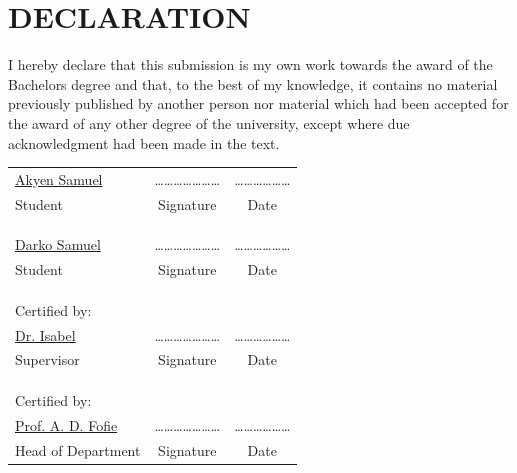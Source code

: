 \chapter*{DECLARATION}

I hereby declare that this submission is my own work towards the award of the Bachelors degree and that,
to the best of my knowledge, it contains no material previously published by another person nor material
which had been accepted for the award of any other degree of the university, except where due 
acknowledgment had been made in the text.\\

\begin{center}
 \begin{tabular}{lcc}
 \underline{Akyen Samuel} &\quad\quad\quad \ldots\ldots\ldots\ldots\ldots\ldots\ldots &\quad\quad\quad \ldots\ldots\ldots\ldots\ldots\ldots \\
 Student &\quad\quad\quad Signature &\quad\quad\quad Date \\
 & & \\
 & & \\
 & & \\

  \underline{Darko Samuel} &\quad\quad\quad \ldots\ldots\ldots\ldots\ldots\ldots\ldots &\quad\quad\quad \ldots\ldots\ldots\ldots\ldots\ldots \\
 Student &\quad\quad\quad Signature &\quad\quad\quad Date \\
 & & \\
 & & \\
 & & \\


  Certified by: & &\\
 \underline{Dr. Isabel} &\quad\quad\quad \ldots\ldots\ldots\ldots\ldots\ldots\ldots &\quad\quad\quad \ldots\ldots\ldots\ldots\ldots\ldots \\
 Supervisor &\quad\quad\quad Signature &\quad\quad\quad Date \\
 & & \\
 & & \\
 & & \\
 Certified by: & &\\
 \underline{Prof. A. D. Fofie} &\quad\quad\quad \ldots\ldots\ldots\ldots\ldots\ldots\ldots &\quad\quad\quad \ldots\ldots\ldots\ldots\ldots\ldots \\
 Head of Department &\quad\quad\quad Signature &\quad\quad\quad Date
\end{tabular}
\end{center}